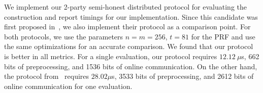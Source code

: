 \begin{table}[!t]
	{
		\centering
        \iffull\else{}\fi
		\caption{Centralized 23-wPRF benchmarks for a baseline implementation and for different optimization techniques. Packing was done into 64-bit sized words (for both $\Z_2$ and $\Z_3$ vectors). For the lookup table optimization, a table with $81 \times 2^{20}$ $\Z_3$ elements, or roughly of size $135$MB, was preprocessed. Runtimes are all given in microseconds ($\mu$s).
		}
		\label{table:optimization_benchmarks}
	}
\end{table}


We implement our 2-party semi-honest distributed protocol for evaluating the \ttwPRF construction and report timings for our implementation. Since this candidate was first proposed in~\cite{boneh2018-darkmatter}, we also implement their protocol as a comparison point. For both protocols, we use the parameters $n=m=256$, $t=81$ for the PRF and use the same optimizations for an accurate comparison. We found that our protocol is better in all metrics. For a single evaluation, our protocol requires $12.12~\mu$s, 662 bits of preprocessing, and 1536 bits of online communication. On the other hand, the protocol from~\cite{boneh2018-darkmatter} requires $28.02\mu$s, 3533 bits of preprocessing, and 2612 bits of online communication for one evaluation.

